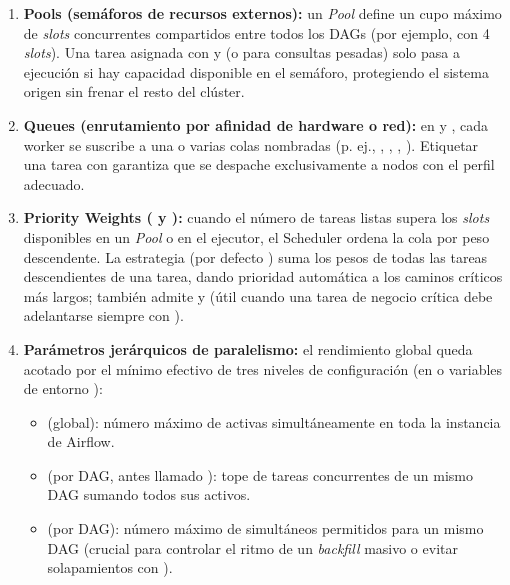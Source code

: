 \begin{enumerate}
  \item \textbf{Pools (semáforos de recursos externos):} un \textit{Pool} define un cupo máximo de \textit{slots} concurrentes compartidos entre todos los DAGs (por ejemplo,  con 4 \textit{slots}). Una tarea asignada con  y  (o  para consultas pesadas) solo pasa a ejecución si hay capacidad disponible en el semáforo, protegiendo el sistema origen sin frenar el resto del clúster.
  \item \textbf{Queues (enrutamiento por afinidad de hardware o red):} en  y , cada worker se suscribe a una o varias colas nombradas (p. ej., , , , ). Etiquetar una tarea con  garantiza que se despache exclusivamente a nodos con el perfil adecuado.
  \item \textbf{Priority Weights ( y ):} cuando el número de tareas listas supera los \textit{slots} disponibles en un \textit{Pool} o en el ejecutor, el Scheduler ordena la cola por peso descendente. La estrategia  (por defecto ) suma los pesos de todas las tareas descendientes de una tarea, dando prioridad automática a los caminos críticos más largos; también admite  y  (útil cuando una tarea de negocio crítica debe adelantarse siempre con ).
  \item \textbf{Parámetros jerárquicos de paralelismo:} el rendimiento global queda acotado por el mínimo efectivo de tres niveles de configuración (en  o variables de entorno ):
  \begin{itemize}
    \item {} (global): número máximo de  activas simultáneamente en toda la instancia de Airflow.
    \item {} (por DAG, antes llamado ): tope de tareas concurrentes de un mismo DAG sumando todos sus  activos.
    \item {} (por DAG): número máximo de  simultáneos permitidos para un mismo DAG (crucial para controlar el ritmo de un \textit{backfill} masivo o evitar solapamientos con ).
  \end{itemize}
\end{enumerate}

